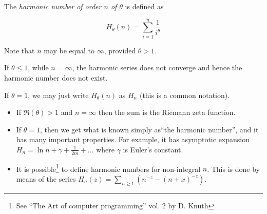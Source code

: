 \documentclass[12pt]{article}
\begin{document}
The \emph{harmonic number of order $n$ of $\theta$} is defined as

$$ H_{\theta}(n) = \sum_{i=1}^n \frac{1}{i^{\theta}} $$

Note that $n$ may be equal to $\infty$, provided $\theta > 1$.  

If $\theta \le 1$, while $n=\infty$, the harmonic series does not converge and hence the harmonic number does not exist.

If $\theta = 1$, we may just write $H_{\theta}(n)$ as $H_n$ (this is a common notation).

\textbf{}

\begin{itemize}
\item If $\Re(\theta) > 1$ and $n=\infty$ then the sum is the Riemann zeta function.
\item If $\theta=1$, then we get what is known simply as``the harmonic number'', and it has many important properties. For example, it has asymptotic expansion $H_n=\ln n+\gamma+\frac{1}{2m}+\dotsc$ where $\gamma$ is Euler's constant.
\item It is possible\footnote{See ``The Art of computer programming'' vol. 2 by D. Knuth} to define harmonic numbers for non-integral $n$. This is done by means of the series  $H_n(z)=\sum_{n\geq 1}(n^{-z}-(n+x)^{-z})$.
\end{itemize}
\end{document}
